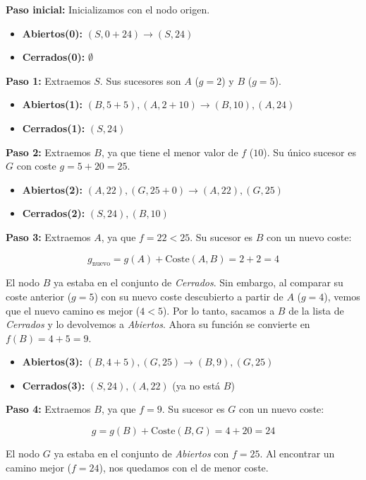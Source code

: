 \documentclass[11pt, a4paper]{article}
\newenvironment{problem}[1][Cuestión]{
	\vspace{0.5cm}
	\noindent{\Large\bfseries #1} \par\vspace{0.5cm}
}{
	\vspace{0.5cm}
}
\begin{document}
\begin{problem}[Cuestión 1 (20\%)]
{			\textbf{Paso inicial:} Inicializamos con el nodo origen.
			\begin{itemize}
				\item \textbf{Abiertos(0):} $(S, 0 + 24) \to (S,24)$
				\item \textbf{Cerrados(0):} $\emptyset$
			\end{itemize}

			\textbf{Paso 1:} Extraemos $S$. Sus sucesores son $A$ ($g=2$) y $B$ ($g=5$).
			\begin{itemize}
				\item \textbf{Abiertos(1):} $(B, 5 +5),(A,2+10) \to (B,10),(A,24)$
				\item \textbf{Cerrados(1):} $(S,24)$
			\end{itemize}

			\textbf{Paso 2:} Extraemos $B$, ya que tiene el menor valor de $f$ ($10$). Su único sucesor es $G$ con coste $g = 5+20 =25$.
			\begin{itemize}
				\item \textbf{Abiertos(2):} $(A,22),(G,25+0) \to (A,22),(G,25)$
				\item \textbf{Cerrados(2):} $(S,24),(B,10)$
			\end{itemize}

			\textbf{Paso 3:} Extraemos $A$, ya que $f = 22 < 25$. Su sucesor es $B$ con un nuevo coste:

			$$g_{\text{nuevo}} = g(A) + \text{Coste}(A,B) = 2 + 2 = 4$$

			El nodo $B$ ya estaba en el conjunto de \textit{Cerrados}. Sin embargo, al comparar su coste anterior ($g=5$) con su nuevo coste descubierto a partir de $A$ ($g=4$), vemos que el nuevo camino es mejor ($4<5$). Por lo tanto, sacamos a $B$ de la lista de \textit{Cerrados} y lo devolvemos a \textit{Abiertos}. Ahora su función se convierte en $f(B) = 4+5=9$.

			\begin{itemize}
				\item \textbf{Abiertos(3):} $(B,4+5),(G,25) \to (B,9),(G,25)$
				\item \textbf{Cerrados(3):} $(S,24),(A,22)$ (ya no está $B$)
			\end{itemize}

			\textbf{Paso 4:} Extraemos $B$, ya que $f = 9$. Su sucesor es $G$ con un nuevo coste:

			$$g = g(B) + \text{Coste}(B,G) = 4+20 = 24$$

			El nodo $G$ ya estaba en el conjunto de \textit{Abiertos} con $f=25$. Al encontrar un camino mejor ($f=24$), nos quedamos con el de menor coste.

}
\end{problem}
\end{document}
